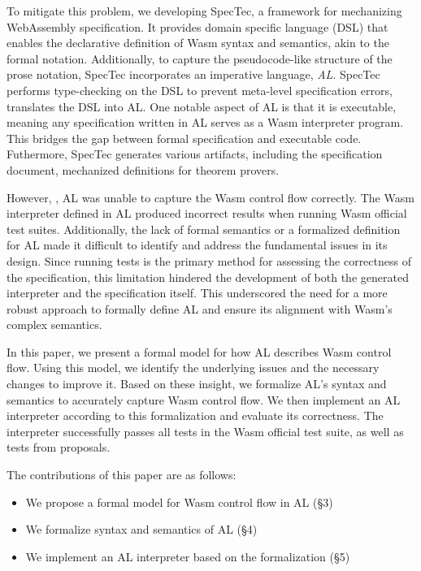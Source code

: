To mitigate this problem, we  developing SpecTec, a framework for
mechanizing WebAssembly specification.
It provides domain specific language (DSL) that enables the declarative
definition of Wasm syntax and semantics, akin to the formal notation.
Additionally, to capture the pseudocode-like structure of the prose notation,
SpecTec incorporates an imperative language, \textit{AL}.
SpecTec performs type-checking on the DSL to prevent meta-level specification
errors, translates the DSL into AL.
One notable aspect of AL is that it is executable, meaning any specification
written in AL serves as a Wasm interpreter program.
This bridges the gap between formal specification and executable code.
Futhermore, SpecTec generates various artifacts, including the specification
document, mechanized definitions for theorem provers.


However, , AL was unable to capture the Wasm control flow
correctly.
The Wasm interpreter defined in AL produced incorrect results when running Wasm
official test suites.
Additionally, the lack of formal semantics or a formalized definition for AL
made it difficult to identify and address the fundamental issues in its design.
Since running tests is the primary method for assessing the correctness of the
specification, this limitation hindered the development of both the generated
interpreter and the specification itself.
This underscored the need for a more robust approach to formally define AL and
ensure its alignment with Wasm's complex semantics.


In this paper, we present a formal model for how AL describes Wasm control flow.
Using this model, we identify the underlying issues and the necessary changes
to improve it.
Based on these insight, we formalize AL's syntax and semantics to accurately
capture Wasm control flow.
We then implement an AL interpreter according to this formalization and
evaluate its correctness.
The interpreter successfully passes all tests in the Wasm official test suite,
as well as tests from proposals.


The contributions of this paper are as follows:
\begin{itemize}
  \item We propose a formal model for Wasm control flow in AL (\S3)
  \item We formalize syntax and semantics of AL (\S4)
  \item We implement an AL interpreter based on the formalization (\S5)
\end{itemize}
